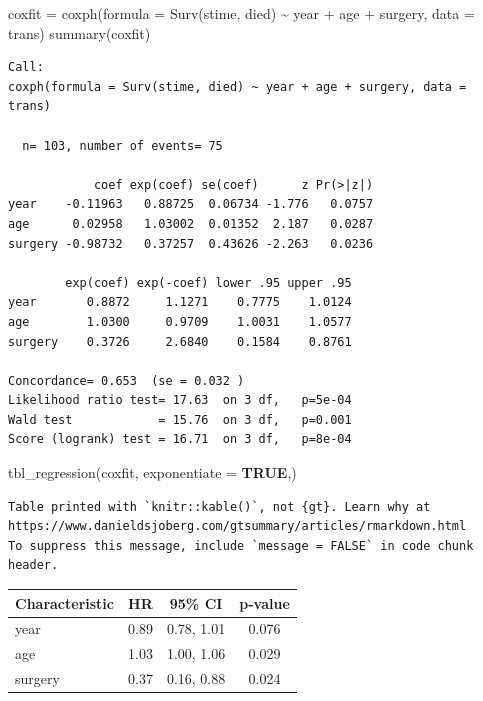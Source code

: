 \documentclass[
  12pt,
  letterpaper,
  DIV=11,
  numbers=noendperiod,
  onepage,
  openany]{scrreprt}
\newenvironment{Shaded}{\begin{snugshade}}{\end{snugshade}}
\newcommand{\AttributeTok}[1]{\textcolor[rgb]{0.80,0.80,0.80}{#1}}
\newcommand{\ConstantTok}[1]{\textcolor[rgb]{0.86,0.64,0.64}{\textbf{#1}}}
\newcommand{\FunctionTok}[1]{\textcolor[rgb]{0.94,0.94,0.56}{#1}}
\newcommand{\NormalTok}[1]{\textcolor[rgb]{0.80,0.80,0.80}{#1}}
\newcommand{\OtherTok}[1]{\textcolor[rgb]{0.94,0.94,0.56}{#1}}
\newcommand{\SpecialCharTok}[1]{\textcolor[rgb]{0.86,0.64,0.64}{#1}}
\begin{document}
\begin{Shaded}
\begin{Highlighting}[]
\NormalTok{coxfit }\OtherTok{=} \FunctionTok{coxph}\NormalTok{(}\AttributeTok{formula =} \FunctionTok{Surv}\NormalTok{(stime, died) }\SpecialCharTok{\textasciitilde{}}\NormalTok{ year }\SpecialCharTok{+}\NormalTok{ age }\SpecialCharTok{+}\NormalTok{ surgery, }\AttributeTok{data =}\NormalTok{ trans)}
\FunctionTok{summary}\NormalTok{(coxfit)}
\end{Highlighting}
\end{Shaded}

\begin{verbatim}
Call:
coxph(formula = Surv(stime, died) ~ year + age + surgery, data = trans)

  n= 103, number of events= 75 

            coef exp(coef) se(coef)      z Pr(>|z|)
year    -0.11963   0.88725  0.06734 -1.776   0.0757
age      0.02958   1.03002  0.01352  2.187   0.0287
surgery -0.98732   0.37257  0.43626 -2.263   0.0236

        exp(coef) exp(-coef) lower .95 upper .95
year       0.8872     1.1271    0.7775    1.0124
age        1.0300     0.9709    1.0031    1.0577
surgery    0.3726     2.6840    0.1584    0.8761

Concordance= 0.653  (se = 0.032 )
Likelihood ratio test= 17.63  on 3 df,   p=5e-04
Wald test            = 15.76  on 3 df,   p=0.001
Score (logrank) test = 16.71  on 3 df,   p=8e-04
\end{verbatim}

\begin{Shaded}
\begin{Highlighting}[]
\FunctionTok{tbl\_regression}\NormalTok{(coxfit, }\AttributeTok{exponentiate =} \ConstantTok{TRUE}\NormalTok{,)}
\end{Highlighting}
\end{Shaded}

\begin{verbatim}
Table printed with `knitr::kable()`, not {gt}. Learn why at
https://www.danieldsjoberg.com/gtsummary/articles/rmarkdown.html
To suppress this message, include `message = FALSE` in code chunk header.
\end{verbatim}

\begin{longtable}[]{@{}lccc@{}}
\toprule\noalign{}
\textbf{Characteristic} & \textbf{HR} & \textbf{95\% CI} &
\textbf{p-value} \\
\midrule\noalign{}
\endhead
\bottomrule\noalign{}
\endlastfoot
year & 0.89 & 0.78, 1.01 & 0.076 \\
age & 1.03 & 1.00, 1.06 & 0.029 \\
surgery & 0.37 & 0.16, 0.88 & 0.024 \\
\end{longtable}
\end{document}
